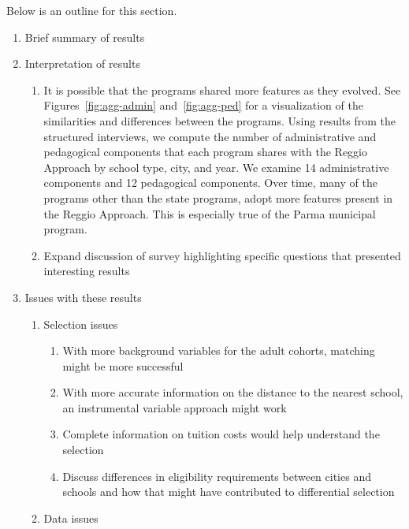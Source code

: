 Below is an outline for this section.

\begin{enumerate}

\item Brief summary of results
\item Interpretation of results
\begin{enumerate}
	\item It is possible that the programs shared more features as they evolved. See Figures~\ref{fig:agg-admin} and~\ref{fig:agg-ped} for a visualization of the similarities and differences between the programs. Using results from the structured interviews, we compute the number of administrative and pedagogical components that each program shares with the Reggio Approach by school type, city, and year. We examine 14 administrative components and 12 pedagogical components. Over time, many of the programs other than the state programs, adopt more features present in the Reggio Approach. This is especially true of the Parma municipal program.
	\item Expand discussion of survey highlighting specific questions that presented interesting results
\end{enumerate}

\item Issues with these results
\begin{enumerate}
	\item Selection issues
	\begin{enumerate}
		\item With more background variables for the adult cohorts, matching might be more successful
		\item With more accurate information on the distance to the nearest school, an instrumental variable approach might work
		\item Complete information on tuition costs would help understand the selection
		\item Discuss differences in eligibility requirements between cities and schools and how that might have contributed to differential selection
	\end{enumerate}
	\item Data issues
\end{enumerate}

\end{enumerate}

